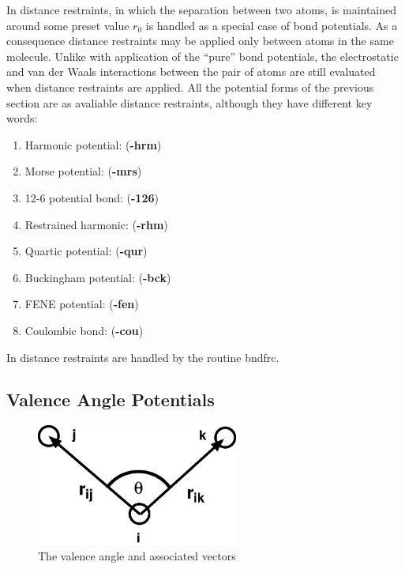 In \D{} distance restraints, in which the separation between two atoms,
is maintained around some preset value $r_0$ is handled as a special
case of bond potentials. As a consequence distance restraints may be
applied only between atoms in the same molecule.  Unlike with
application of the ``pure'' bond potentials, the electrostatic and van
der Waals interactions between the pair of atoms are still evaluated
when distance restraints are applied.  All the potential forms of the
previous section are as avaliable distance restraints, although they
have different key words:

\begin{enumerate}
\item Harmonic potential: ({\bf -hrm})
\item Morse potential:  ({\bf -mrs})
\item 12-6 potential bond: ({\bf -126})
\item Restrained harmonic: ({\bf -rhm})
\item Quartic potential:  ({\bf -qur})
\item Buckingham potential: ({\bf -bck})
\item FENE potential: ({\bf -fen})
\item Coulombic bond: ({\bf -cou})
\end{enumerate}

In \D{} distance restraints are handled by the routine {\sc bndfrc}.

\subsection{Valence Angle Potentials}

\begin{figure}[ht]
\begin{center}
\includegraphics[height=4cm]{angle.eps}
\caption{The valence angle and associated vectors}
\end{center}
\end{figure}

